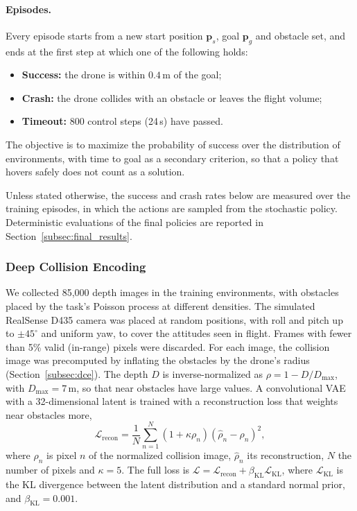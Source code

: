 \paragraph{Episodes.} Every episode starts from a new start position $\mathbf{p}_s$, goal $\mathbf{p}_g$ and obstacle set, and ends at the first step at which one of the following holds:
\begin{itemize}
    \item \textbf{Success:} the drone is within $0.4$\,m of the goal;
    \item \textbf{Crash:} the drone collides with an obstacle or leaves the flight volume;
    \item \textbf{Timeout:} 800 control steps (24\,s) have passed.
\end{itemize}
The objective is to maximize the probability of success over the distribution of environments, with time to goal as a secondary criterion, so that a policy that hovers safely does not count as a solution.

Unless stated otherwise, the success and crash rates below are measured over the training episodes, in which the actions are sampled from the stochastic policy. Deterministic evaluations of the final policies are reported in Section~\ref{subsec:final_results}.

\subsubsection{Deep Collision Encoding}
\label{subsec:vae}
We collected 85,000 depth images in the training environments, with obstacles placed by the task's Poisson process at different densities. The simulated RealSense D435 camera was placed at random positions, with roll and pitch up to $\pm 45^\circ$ and uniform yaw, to cover the attitudes seen in flight. Frames with fewer than 5\% valid (in-range) pixels were discarded. For each image, the collision image was precomputed by inflating the obstacles by the drone's radius (Section~\ref{subsec:dce}). The depth $D$ is inverse-normalized as $\rho = 1 - D/D_{\max}$, with $D_{\max} = 7$\,m, so that near obstacles have large values. A convolutional VAE with a 32-dimensional latent is trained with a reconstruction loss that weights near obstacles more,
\begin{equation}
    \mathcal{L}_{\mathrm{recon}} = \frac{1}{N}\sum_{n=1}^{N} (1+\kappa \rho_n)(\hat{\rho}_n-\rho_n)^2 ,
    \label{eq:recon_loss}
\end{equation}
where $\rho_n$ is pixel $n$ of the normalized collision image, $\hat{\rho}_n$ its reconstruction, $N$ the number of pixels and $\kappa = 5$. The full loss is $\mathcal{L} = \mathcal{L}_{\mathrm{recon}} + \beta_{\mathrm{KL}} \mathcal{L}_{\mathrm{KL}}$, where $\mathcal{L}_{\mathrm{KL}}$ is the KL divergence between the latent distribution and a standard normal prior, and $\beta_{\mathrm{KL}} = 0.001$.

